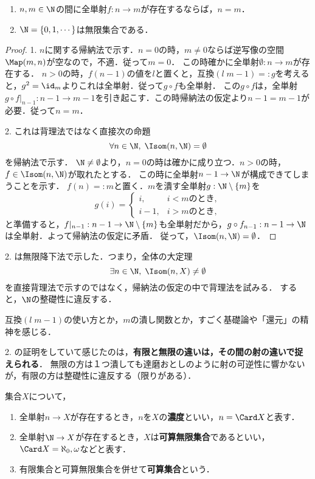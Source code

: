 \documentclass[uplatex,dvipdfmx]{jsreport}
\begin{document}
\begin{proposition}[有限集合には元の個数が定まる]\mbox{}
    \begin{enumerate}
        \item $n,m\in\N$の間に全単射$f:n\to m$が存在するならば，$n=m$．
        \item $\N=\{0,1,\cdots\}$は無限集合である．
\end{enumerate}
\end{proposition}
\begin{proof}
    1. $n$に関する帰納法で示す．$n=0$の時，$m\ne 0$ならば逆写像の空間$\Map(m,n)$が空なので，不適．従って$m=0$．
    この時確かに全単射$\emptyset:n\to m$が存在する．
    $n>0$の時，$f(n-1)$の値を$l$と置くと，互換$(l\;m-1)=:g$を考えると，$g^2=\id_{m}$よりこれは全単射．従って$g\circ f$も全単射．
    この$g\circ f$は，全単射$g\circ f|_{n-1}:n-1\to m-1$を引き起こす．この時帰納法の仮定より$n-1=m-1$が必要．従って$n=m$．

    2. これは背理法ではなく直接次の命題
    \[ \forall n\in\N,\;\Isom(n,\N)=\emptyset \]
    を帰納法で示す．
    $\N\ne\emptyset$より，$n=0$の時は確かに成り立つ．$n>0$の時，$f\in\Isom(n,\N)$が取れたとする．
    この時に全単射$n-1\to\N$が構成できてしまうことを示す．
    $f(n)=:m$と置く．$m$を潰す全単射$g:\N\setminus\{m\}$を
    \[g(i)=\begin{cases}
        i,&i<mのとき,\\
        i-1,&i>mのとき,
    \end{cases}\]
    と準備すると，$f|_{n-1}:n-1\to\N\setminus\{m\}$も全単射だから，$g\circ f_{n-1}:n-1\to\N$は全単射．よって帰納法の仮定に矛盾．
    従って，$\Isom(n,\N)=\emptyset$．
\end{proof}
\begin{remarks}[無限降下法は背理法と帰納的構造との合体]
    2. は無限降下法で示した．つまり，全体の大定理
    \[ \exists n\in\N,\; \Isom(n,X)\ne\emptyset \]
    を直接背理法で示すのではなく，帰納法の仮定の中で背理法を試みる．
    すると，$\N$の整礎性に違反する．

    互換$(l\;m-1)$の使い方とか，$m$の潰し関数とか，すごく基礎論や「還元」の精神を感じる．

    2. の証明をしていて感じたのは，\textbf{有限と無限の違いは，その間の射の違いで捉えられる}．
    無限の方は１つ潰しても達磨おとしのように射の可逆性に響かないが，有限の方は整礎性に違反する（限りがある）．
\end{remarks}

\begin{definition}
    集合$X$について，
    \begin{enumerate}
        \item 全単射$n\to X$が存在するとき，$n$を$X$の\textbf{濃度}といい，$n=\Card X$と表す．
        \item 全単射$\N\to X$が存在するとき，$X$は\textbf{可算無限集合}であるといい，$\Card X=\aleph_0,\omega$などと表す．
        \item 有限集合と可算無限集合を併せて\textbf{可算集合}という．
    \end{enumerate}
\end{definition}
\end{document}
